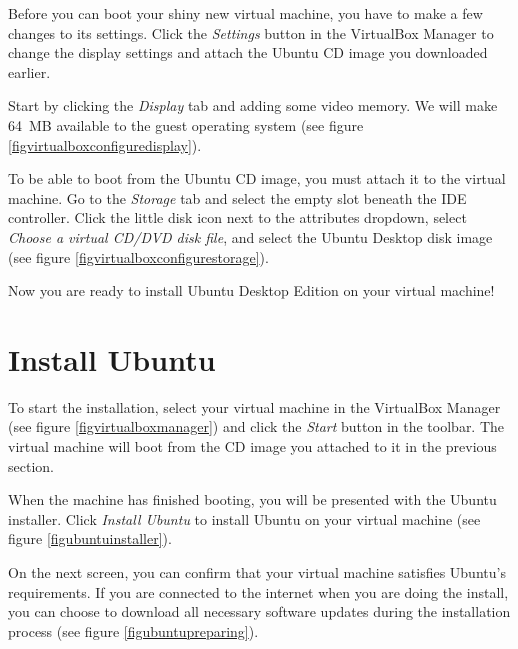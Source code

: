 \documentclass[ebook,10pt,twoside,openright]{memoir}
\begin{document}
Before you can boot your shiny new virtual machine, you have to make a few changes to its settings. Click the \emph{Settings} button in the VirtualBox Manager to change the display settings and attach the Ubuntu CD image you downloaded earlier.

Start by clicking the \emph{Display} tab and adding some video memory. We will make 64~MB available to the guest operating system (see figure \ref{figvirtualboxconfiguredisplay}).


To be able to boot from the Ubuntu CD image, you must attach it to the virtual machine. Go to the \emph{Storage} tab and select the empty slot beneath the IDE controller. Click the little disk icon next to the attributes dropdown, select \emph{Choose a virtual CD/DVD disk file}, and select the Ubuntu Desktop disk image (see figure \ref{figvirtualboxconfigurestorage}).


Now you are ready to install Ubuntu Desktop Edition on your virtual machine!


\section{Install Ubuntu} \label{secinstallubuntu}

To start the installation, select your virtual machine in the VirtualBox Manager (see figure \ref{figvirtualboxmanager}) and click the \emph{Start} button in the toolbar. The virtual machine will boot from the CD image you attached to it in the previous section.


When the machine has finished booting, you will be presented with the Ubuntu installer. Click \emph{Install Ubuntu} to install Ubuntu on your virtual machine (see figure \ref{figubuntuinstaller}).


On the next screen, you can confirm that your virtual machine satisfies Ubuntu's requirements. If you are connected to the internet when you are doing the install, you can choose to download all necessary software updates during the installation process (see figure \ref{figubuntupreparing}).
\end{document}
